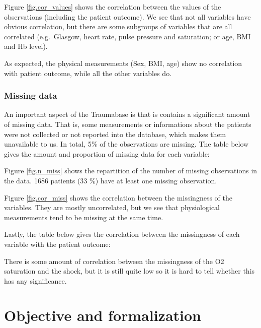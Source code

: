 Figure \ref{fig.cor_values} shows the correlation between the values of the observations (including the patient outcome). We see that not all variables have obvious correlation, but there are some subgroups of variables that are all correlated (e.g.\ Glasgow, heart rate, pulse pressure and saturation; or age, BMI and Hb level). 

As expected, the physical measurements (Sex, BMI, age) show no correlation with patient outcome, while all the other variables do. 

			\subsubsection{Missing data}
			
An important aspect of the Traumabase is that is contains a significant amount of missing data. That is, some measurements or informations about the patients were not collected or not reported into the database, which makes them unavailable to us. In total, 5\% of the observations are missing. The table below gives the amount and proportion of missing data for each variable:



Figure \ref{fig.n_miss} shows the repartition of the number of missing observations in the data. 1686 patients (33 \%) have at least one missing observation.


			
Figure \ref{fig.cor_miss} shows the correlation between the missingness of the variables. They are mostly uncorrelated, but we see that physiological measurements tend to be missing at the same time.


Lastly, the table below gives the correlation between the missingness of each variable with the patient outcome:



There is some amount of correlation between the missingness of the O2 saturation and the shock, but it is still quite low so it is hard to tell whether this has any significance.


	\section{Objective and formalization}
